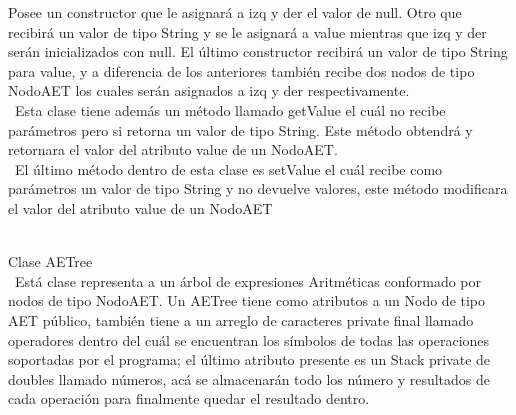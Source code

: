 \documentclass{report}
\begin{document}
Posee un  constructor que le asignará a izq y der el valor de null. Otro que recibirá un valor de tipo String y se le asignará a value mientras que izq y der serán inicializados con null. El último constructor recibirá un valor de tipo String para value, y a diferencia de los anteriores también recibe dos nodos de tipo NodoAET los cuales serán asignados a izq y der respectivamente.\\\
Esta clase tiene además un método llamado getValue  el cuál no recibe parámetros pero si retorna un valor de tipo String. Este método obtendrá y retornara el valor del atributo value de un NodoAET.\\\
El último método dentro de esta clase es setValue el cuál recibe como parámetros un valor de tipo String y no devuelve valores,  este método modificara el valor del atributo value de un NodoAET \\\

Clase AETree\\\
Está clase representa a un árbol de expresiones Aritméticas conformado por nodos de tipo NodoAET. Un AETree tiene como atributos a un Nodo de tipo AET público, también tiene a un arreglo de caracteres private final llamado operadores dentro del cuál se encuentran los símbolos de todas las operaciones soportadas por el programa; el último atributo presente es un Stack private de doubles llamado números, acá se almacenarán todo los número y resultados de cada operación para finalmente quedar el resultado dentro.\\\
\end{document}
